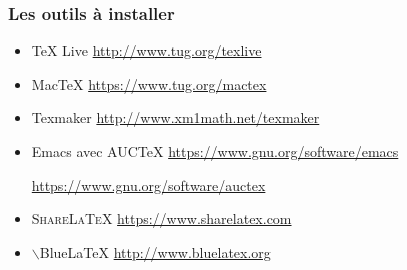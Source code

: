 
\begin{frame}[fragile]
  \frametitle{Les outils à installer}



  \begin{itemize}
  \item \TeX{} Live \hfill \url{http://www.tug.org/texlive}
  \item Mac\TeX{} \hfill \url{https://www.tug.org/mactex}
  \end{itemize}
  
  \pause


  \begin{itemize}
  \item Texmaker \hfill \url{http://www.xm1math.net/texmaker}
    
  \item Emacs avec AUC\TeX{} \hfill \url{https://www.gnu.org/software/emacs}
    
    \hfill \url{https://www.gnu.org/software/auctex}
    
  \end{itemize}
    
  \pause
  

  \begin{itemize}
  \item \textsc{ShareLaTeX} \hfill \url{https://www.sharelatex.com}
  \item $\backslash{}$BlueLaTeX \hfill \url{http://www.bluelatex.org}
  \end{itemize}
\end{frame}


